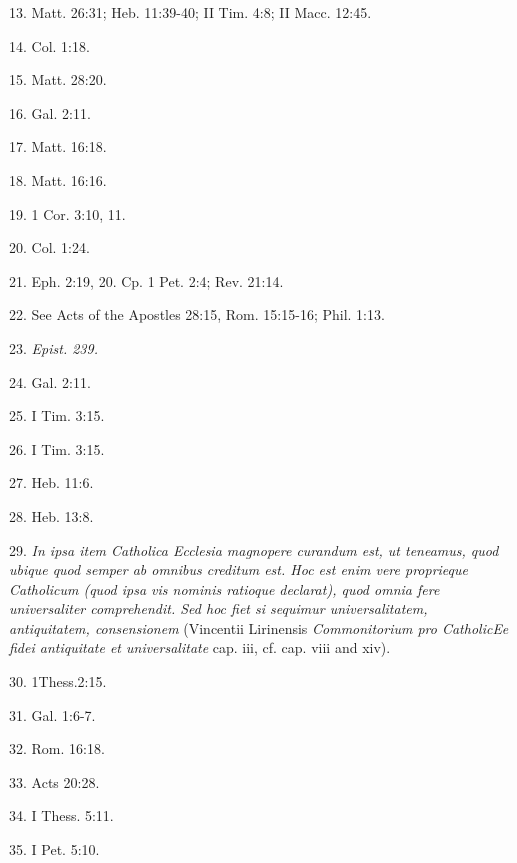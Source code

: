 13. Matt. 26:31; Heb. 11:39-40; II Tim. 4:8; II Macc. 12:45.

14. Col. 1:18.

15. Matt. 28:20.

16. Gal. 2:11.

17. Matt. 16:18.

18. Matt. 16:16.

19. 1 Cor. 3:10, 11.

20. Col. 1:24.

21. Eph. 2:19, 20. Cp. 1 Pet. 2:4; Rev. 21:14.

22. See Acts of the Apostles 28:15, Rom. 15:15-16; Phil. 1:13.

23. \emph{Epist. 239.}

24. Gal. 2:11.

25. I Tim. 3:15.

26. I Tim. 3:15.

27. Heb. 11:6.

28. Heb. 13:8.

29. \textquotesingle{}\emph{In ipsa item Catholica Ecclesia magnopere
curandum est, ut teneamus, quod ubique quod semper ab omnibus creditum
est. Hoc est enim vere proprieque Catholicum (quod ipsa vis nominis
ratioque declarat), quod omnia fere universaliter comprehendit. Sed hoc
fiet si sequimur universalitatem, antiquitatem,
consensionem\textquotesingle{}} (Vincentii Lirinensis
\emph{Commonitorium pro CatholicEe fidei antiquitate et universalitate}
cap. iii, cf. cap. viii and xiv).

30. 1Thess.2:15.

31. Gal. 1:6-7.

32. Rom. 16:18.

33. Acts 20:28.

34. I Thess. 5:11.

35. I Pet. 5:10.
